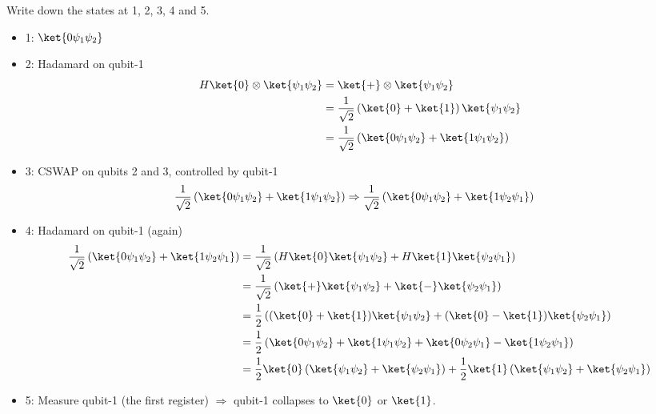 \documentclass[12pt]{exam}
\begin{document}
\begin{questions}
Write down the states at 1, 2, 3, 4 and 5.

\begin{solution}
  \begin{itemize}
\item 1: $\ket{0 \psi_1 \psi_2}$
\item 2: Hadamard on qubit-1
  \begin{align*}
H\ket{0} \otimes \ket{\psi_1 \psi_2}
  &=
  \ket{+} \otimes \ket{\psi_1 \psi_2} \\
  &=
  \frac{1}{\sqrt{2}}\left( \ket{0} + \ket{1} \right) \ket{\psi_1 \psi_2} \\
  &=
  \frac{1}{\sqrt{2}}\left( \ket{0\psi_1 \psi_2} + \ket{1\psi_1 \psi_2} \right) \\
  \end{align*}
\item 3: CSWAP on qubits 2 and 3, controlled by qubit-1
  \begin{align*}
\frac{1}{\sqrt{2}}\left( \ket{0\psi_1 \psi_2} + \ket{1\psi_1 \psi_2} \right)
  &\Rightarrow
\frac{1}{\sqrt{2}}\left( \ket{0\psi_1 \psi_2} + \ket{1\psi_2 \psi_1} \right)
  \end{align*}
\item 4: Hadamard on qubit-1 (again)
  \begin{align*}
\frac{1}{\sqrt{2}}\left( \ket{0\psi_1 \psi_2} + \ket{1\psi_2 \psi_1} \right)
    &=
\frac{1}{\sqrt{2}}
  \left(
      H\ket{0}\ket{\psi_1 \psi_2}
      +
      H\ket{1}\ket{\psi_2 \psi_1}
  \right) \\
    &=
\frac{1}{\sqrt{2}}
  \left(
      \ket{+}\ket{\psi_1 \psi_2}
      +
      \ket{-}\ket{\psi_2 \psi_1}
  \right) \\
    &=
\frac{1}{2}
  \left(
      (\ket{0}+\ket{1})\ket{\psi_1 \psi_2}
      +
      (\ket{0}-\ket{1})\ket{\psi_2 \psi_1}
  \right) \\
    &=
\frac{1}{2}
  \left(
        \ket{0\psi_1 \psi_2}
      + \ket{1\psi_1 \psi_2}
      + \ket{0\psi_2 \psi_1}
      - \ket{1\psi_2 \psi_1}
  \right) \\
    &=
\frac{1}{2}\ket{0}
  \left(
    \ket{\psi_1 \psi_2} + \ket{\psi_2 \psi_1}
  \right)
+
\frac{1}{2}\ket{1}
  \left(
    \ket{\psi_1 \psi_2} + \ket{\psi_2 \psi_1}
  \right)
  \end{align*}
\item 5: Measure qubit-1 (the first register) $\Rightarrow$
  qubit-1 collapses to $\ket{0}$ or $\ket{1}$.
% 
  \end{itemize}
\end{solution}


\end{questions}
\end{document}
